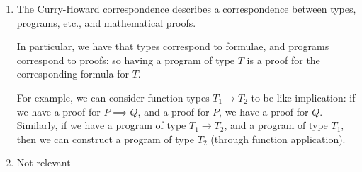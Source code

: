 


\begin{enumerate}[label=(\alph*)]

    \item
        The Curry-Howard correspondence describes a correspondence between types, programs, etc., and mathematical proofs.

        In particular, we have that types correspond to formulae, and programs correspond to proofs: so having a program of type $T$ is a proof for the corresponding formula for $T$.

        For example, we can consider function types $T_1 \rightarrow T_2$ to be like implication: if we have a proof for $P \implies Q$, and a proof for $P$, we have a proof for $Q$. Similarly, if we have a program of type $T_1 \rightarrow T_2$, and a program of type $T_1$, then we can construct a program of type $T_2$ (through function application).

    \item
        Not relevant

        
    \end{enumerate}

